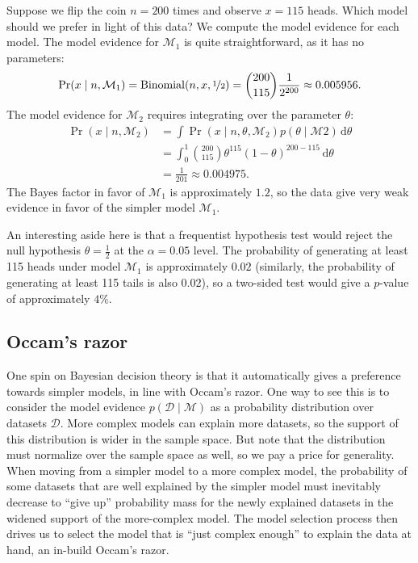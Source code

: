 \documentclass{article}
\newcommand{\given}{\mid}
\newcommand{\mc}[1]{\mathcal{#1}}
\newcommand{\data}{\mc{D}}
\newcommand{\model}{\mc{M}}
\newcommand{\intd}[1]{\,\mathrm{d}{#1}}
\begin{document}
Suppose we flip the coin $n = 200$ times and observe $x = 115$ heads.
Which model should we prefer in light of this data?  We compute the
model evidence for each model.  The model evidence for $\model_1$ is
quite straightforward, as it has no parameters:
\begin{equation*}
  \Pr(x \given n, \model_1)
  =
  \mathrm{Binomial}(n, x, \nicefrac{1}{2})
  =
  \binom{200}{115}
  \frac{1}{2^{200}}
  \approx
  0.005956.
\end{equation*}
The model evidence for $\model_2$ requires integrating over the
parameter $\theta$:
\begin{align*}
  \Pr(x \given n, \model_2)
  &=
  \int
  \Pr(x \given n, \theta, \model_2)
  p(\theta \given \model2)
  \intd{\theta}
  \\
  &=
  \int_{0}^{1}
  \binom{200}{115}
  \theta^{115}
  (1 - \theta)^{200 - 115}
  \intd{\theta}
  \\
  &=
  \frac{1}{201}
  \approx
  0.004975.
\end{align*}
The Bayes factor in favor of $\model_1$ is approximately $1.2$, so the
data give very weak evidence in favor of the simpler model $\model_1$.

An interesting aside here is that a frequentist hypothesis test would
reject the null hypothesis $\theta = \frac{1}{2}$ at the $\alpha =
0.05$ level. The probability of generating at least 115 heads under
model $\model_1$ is approximately $0.02$ (similarly, the probability
of generating at least 115 tails is also $0.02$), so a two-sided test
would give a $p$-value of approximately $4\%$.

\subsection*{Occam's razor}

One spin on Bayesian decision theory is that it automatically gives a
preference towards simpler models, in line with Occam's razor.  One
way to see this is to consider the model evidence $p(\data \given
\model)$ as a probability distribution over datasets $\data$.  More
complex models can explain more datasets, so the support of this
distribution is wider in the sample space.  But note that the
distribution must normalize over the sample space as well, so we pay a
price for generality.  When moving from a simpler model to a more
complex model, the probability of some datasets that are well
explained by the simpler model must inevitably decrease to ``give up''
probability mass for the newly explained datasets in the widened
support of the more-complex model.  The model selection process then
drives us to select the model that is ``just complex enough'' to
explain the data at hand, an in-build Occam's razor.
\end{document}
